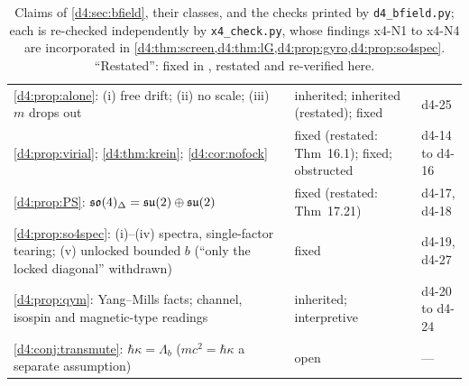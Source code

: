 \begin{table}[t]
\begin{tabular}{@{}>{\raggedright\arraybackslash}p{8.0cm}>{\raggedright\arraybackslash}p{5.1cm}>{\raggedright\arraybackslash}p{2.0cm}@{}}
\cref{d4:prop:alone}: (i) free drift; (ii) no scale; (iii) $m$ drops out & inherited; inherited (restated); fixed & d4-25\\
\cref{d4:prop:virial}; \cref{d4:thm:krein}; \cref{d4:cor:nofock} & fixed (restated: Thm~16.1); fixed; obstructed & d4-14 to d4-16\\
\cref{d4:prop:PS}: $\mathfrak{so}(4)_\Delta=\mathfrak{su}(2)\oplus\mathfrak{su}(2)$ & fixed (restated: Thm~17.21) & d4-17, d4-18\\
\cref{d4:prop:so4spec}: (i)--(iv) spectra, single-factor tearing; (v) unlocked bounded $b$ (``only the locked diagonal'' withdrawn) & fixed & d4-19, d4-27\\
\cref{d4:prop:qym}: Yang--Mills facts; channel, isospin and magnetic-type readings & inherited; interpretive & d4-20 to d4-24\\
\cref{d4:conj:transmute}: $\hbar\kappa=\Lambda_b$ ($mc^2=\hbar\kappa$ a separate assumption) & open & ---\\
\bottomrule
\end{tabular}
\caption{Claims of \cref{d4:sec:bfield}, their classes, and the checks printed by \texttt{d4\_bfield.py}; each is re-checked independently by
\texttt{x4\_check.py}, whose findings x4-N1 to x4-N4 are incorporated in \cref{d4:thm:screen,d4:thm:lG,d4:prop:gyro,d4:prop:so4spec}.
``Restated'': fixed in \cite{ES17}, restated and re-verified here.}
\label{d4:tab:claims}
\end{table}
